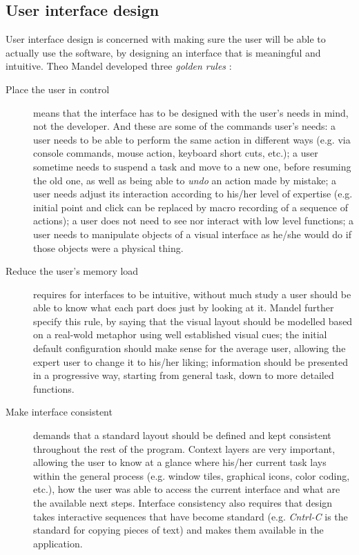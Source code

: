 \subsection{User interface design}
User interface design is concerned with making sure the user will be able to
actually use the software, by designing an interface that is meaningful and
intuitive. Theo Mandel developed three \emph{golden rules} \cite{TM97}:
\begin{description}
\item[Place the user in control] means that the interface has to be designed
with the user's needs in mind, not the developer. And these are some of the
commands user's needs: a user needs to be able to perform the same action in
different ways (e.g. via console commands, mouse action, keyboard short cuts,
etc.); a user sometime needs to suspend a task and move to a new one, before
resuming the old one, as well as being able to \emph{undo} an action made by
mistake; a user needs adjust its interaction according to his/her level of
expertise (e.g. initial point and click can be replaced by macro recording of a
sequence of actions); a user does not need to see nor interact with low level
functions; a user needs to manipulate objects of a visual interface as he/she
would do if those objects were a physical thing.
\item[Reduce the user's memory load] requires for interfaces to be intuitive,
without much study a user should be able to know what each part does just by
looking at it. Mandel \cite{TM97} further specify this rule, by saying that the
visual layout should be modelled based on a real-wold metaphor using well
established visual cues; the initial default configuration should make sense for
the average user, allowing the expert user to change it to his/her liking;
information should be presented in a progressive way, starting from general
task, down to more detailed functions.
\item[Make interface consistent] demands that a standard layout should be
defined and kept consistent throughout the rest of the program. Context layers
are very important, allowing the user to know at a glance where his/her current
task lays within the general process (e.g. window tiles, graphical icons, color
coding, etc.), how the user was able to access the current interface and what
are the available next steps. Interface consistency also requires that design
takes interactive sequences that have become standard (e.g. \emph{Cntrl-C} is
the standard for copying pieces of text) and makes them available in the
application.
\end{description}

